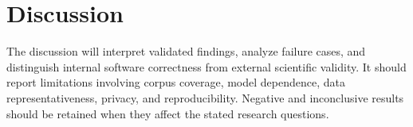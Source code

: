 \section{Discussion}

The discussion will interpret validated findings, analyze failure cases, and distinguish internal software correctness from external scientific validity. It should report limitations involving corpus coverage, model dependence, data representativeness, privacy, and reproducibility. Negative and inconclusive results should be retained when they affect the stated research questions.
